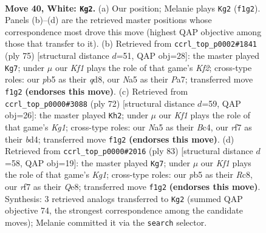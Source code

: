 \documentclass[11pt]{article}
\begin{document}
\clearpage

\begin{figure}[p]\centering
\begin{subfigure}{0.46\textwidth}\centering
\resizebox{\linewidth}{!}{%
\newchessgame
\chessboard[
  setfen={2r3k1/5r1p/8/Np6/3Q2PP/8/PP3P2/3R1K2 w - - 1 40},
  showmover=false,
  pgfstyle=straightmove, color=movearrow, markmove={f1-g2}
]}
\caption{}
\end{subfigure}\hfill
\begin{subfigure}{0.46\textwidth}\centering
\resizebox{\linewidth}{!}{%
\newchessgame
\chessboard[
  setfen={3Q4/p3rk2/1p3p2/4q2p/8/1P5P/P5P1/5RK1 b - - 9 38},
  showmover=false,
  pgfstyle=straightmove, color=movearrow, markmove={f7-g7}
]}
\caption{}
\end{subfigure}
\\[4pt]
\begin{subfigure}{0.46\textwidth}\centering
\resizebox{\linewidth}{!}{%
\newchessgame
\chessboard[
  setfen={1r5k/6p1/5r1p/8/2Bb4/7P/5PP1/4Q1K1 w - - 5 37},
  showmover=false,
  pgfstyle=straightmove, color=movearrow, markmove={g1-h2}
]}
\caption{}
\end{subfigure}\hfill
\begin{subfigure}{0.46\textwidth}\centering
\resizebox{\linewidth}{!}{%
\newchessgame
\chessboard[
  setfen={2r1q1k1/R4p2/3p2p1/7p/2n1P3/1Q4P1/4R1KP/8 b - - 3 42},
  showmover=false,
  pgfstyle=straightmove, color=movearrow, markmove={g8-g7}
]}
\caption{}
\end{subfigure}
\caption{\textbf{Move 40, White: \texttt{Kg2}.} (a) Our position; Melanie plays \texttt{Kg2} (\texttt{f1g2}). Panels (b)--(d) are the retrieved master positions whose correspondence most drove this move (highest QAP objective among those that transfer to it). (b) Retrieved from \texttt{ccrl\_top\_p0002\#1841} (ply 75) [structural distance $d$=51, QAP obj=28]: the master played \texttt{Kg7}; under $\mu$ our \emph{Kf1} plays the role of that game's \emph{Kf2}; cross-type roles: our \emph{p}b5 as their \emph{q}d8, our \emph{N}a5 as their \emph{P}a7; transferred move \texttt{f1g2} \textbf{(endorses this move)}. (c) Retrieved from \texttt{ccrl\_top\_p0000\#3088} (ply 72) [structural distance $d$=59, QAP obj=26]: the master played \texttt{Kh2}; under $\mu$ our \emph{Kf1} plays the role of that game's \emph{Kg1}; cross-type roles: our \emph{N}a5 as their \emph{B}c4, our \emph{r}f7 as their \emph{b}d4; transferred move \texttt{f1g2} \textbf{(endorses this move)}. (d) Retrieved from \texttt{ccrl\_top\_p0000\#2016} (ply 83) [structural distance $d$=58, QAP obj=19]: the master played \texttt{Kg7}; under $\mu$ our \emph{Kf1} plays the role of that game's \emph{Kg1}; cross-type roles: our \emph{p}b5 as their \emph{R}c8, our \emph{r}f7 as their \emph{Q}e8; transferred move \texttt{f1g2} \textbf{(endorses this move)}. Synthesis: 3 retrieved analogs transferred to \texttt{Kg2} (summed QAP objective 74, the strongest correspondence among the candidate moves); Melanie committed it via the \texttt{search} selector.}
\label{fig:thought-m78}
\end{figure}
\end{document}
